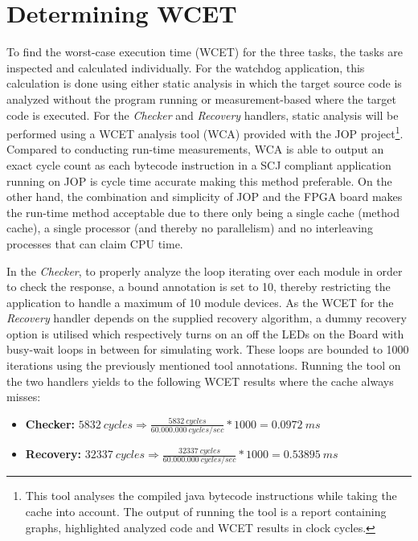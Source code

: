 \section{Determining WCET} %
\label{sec:determining_wcet}
To find the worst-case execution time (WCET) for the three tasks, the tasks are inspected and calculated individually. For the watchdog application, this calculation is done using either static analysis in which the target source code is analyzed without the program running or measurement-based where the target code is executed. For the \textit{Checker} and \textit{Recovery} handlers, static analysis will be performed using a WCET analysis tool (WCA) provided with the JOP project\footnote{This tool analyses the compiled java bytecode instructions while taking the cache into account. The output of running the tool is a report containing graphs, highlighted analyzed code and WCET results in clock cycles.}. Compared to conducting run-time measurements, WCA is able to output an exact cycle count as each bytecode instruction in a SCJ compliant application running on JOP is cycle time accurate making this method preferable. On the other hand, the combination and simplicity of JOP and the FPGA board makes the run-time method acceptable due to there only being a single cache (method cache), a single processor (and thereby no parallelism) and no interleaving processes that can claim CPU time.

In the \textit{Checker}, to properly analyze the loop iterating over each module in order to check the response, a bound annotation is set to 10, thereby restricting the application to handle a maximum of 10 module devices. As the WCET for the \textit{Recovery} handler depends on the supplied recovery algorithm, a dummy recovery option is utilised which respectively turns on an off the LEDs on the Board with busy-wait loops in between for simulating work. These loops are bounded to 1000 iterations using the previously mentioned tool annotations. Running the tool on the two handlers yields to the following WCET results where the cache always misses:
\begin{itemize}
    \item \textbf{Checker:} $5832\ cycles \Rightarrow \frac{5832\ cycles}{60.000.000\ cycles/sec} * 1000 = 0.0972\ ms$
    \item \textbf{Recovery:} $32337\ cycles \Rightarrow \frac{32337\ cycles}{60.000.000\ cycles/sec} * 1000 = 0.53895\ ms$
\end{itemize}

